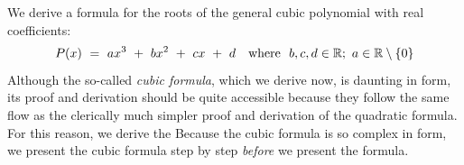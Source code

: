   

We derive a formula for the roots of the general cubic polynomial  with real coefficients:
\begin{equation}
\label{eq:generic-cubic-1}
P(x) \ = \  ax^3 \ + \ bx^2 \ + \ cx \ + \ d \ \ \mbox{  where  }
\ b,c, d  \in \mathbb{R};\ a \in \mathbb{R} \setminus \{0\}
\end{equation}
Although the so-called {\em cubic formula}, which we derive now, is daunting in form, its proof and derivation should be quite accessible because they follow the same flow as the clerically much simpler proof and derivation of the quadratic formula.  For this reason, we derive the 
Because the cubic formula is so complex in form, we present the cubic formula step by step {\em before} we present the formula.

